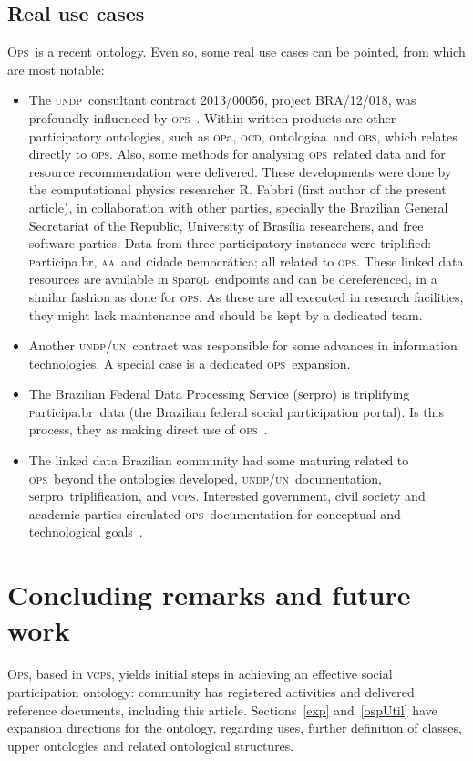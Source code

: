\documentclass[10pt,letterpaper]{article}
\newcommand{\ops}{\textsc{ops}}
\newcommand{\opsi}{O\textsc{ps}}
\newcommand{\vcps}{\textsc{vcps}}
\newcommand{\sparql}{\textsc{s}par\textsc{ql}}
\newcommand{\opa}{\textsc{op}a}
\newcommand{\ocd}{\textsc{ocd}}
\newcommand{\ontologiaa}{\textsc{o}ntologiaa}
\newcommand{\obs}{\textsc{obs}}
\newcommand{\aan}{\textsc{aa}}
\newcommand{\cidadedemocratica}{\textsc{c}idade \textsc{d}emocr\'atica}
\newcommand{\participa}{\textsc{p}articipa.br}
\newcommand{\pnud}{\textsc{undp}}
\newcommand{\onu}{\textsc{un}}
\newcommand{\serpro}{\textsc{s}erpro}
\begin{document}
\subsection{Real use cases}\label{sec:real}
\opsi\ is a recent ontology. Even so, some real use cases can be pointed, from which are most notable:
\begin{itemize}
    \item The \pnud\ consultant contract 2013/00056, project BRA/12/018, was profoundly influenced by \ops~\cite{pnud5}. Within written products are other participatory ontologies, such as \opa, \ocd, \ontologiaa\ and \obs, which relates directly to \ops. Also, some methods for analysing \ops\ related data and for resource recommendation were delivered. These developments were done by the computational physics researcher R. Fabbri (first author of the present article), in collaboration with other parties, specially the Brazilian General Secretariat of the Republic, University of Bras\'ilia researchers, and free software parties. Data from three participatory instances were triplified: \participa, \aan\ and \cidadedemocratica; all related to \ops. These linked data resources are available in \sparql\ endpoints and can be dereferenced, in a similar fashion as done for \ops. As these are all executed in research facilities, they might lack maintenance and should be kept by a dedicated team.
    \item Another \pnud/\onu\ contract was responsible for some advances in information technologies. A special case is a dedicated \ops\ expansion\cite{paulo6}.
    \item The Brazilian Federal Data Processing Service (\serpro) is triplifying \participa\ data (the Brazilian federal social participation portal). Is this process, they as making direct use of \ops~\cite{tripSerpro}.
    \item The linked data Brazilian community had some maturing related to \ops\ beyond the ontologies developed, \pnud/\onu\ documentation, \serpro\ triplification, and \vcps. Interested government, civil society and academic parties circulated \ops\ documentation for conceptual and technological goals~\cite{circulaOps1,circulaOps2}.
\end{itemize}

\section{Concluding remarks and future work}\label{conc}
\opsi, based in \vcps,
yields initial steps in achieving an effective social participation ontology: community has registered activities and delivered reference documents, including this article.
Sections~\ref{exp} and~\ref{ospUtil} have expansion directions for the ontology, regarding uses, further definition of classes, upper ontologies and related ontological structures.
\end{document}
